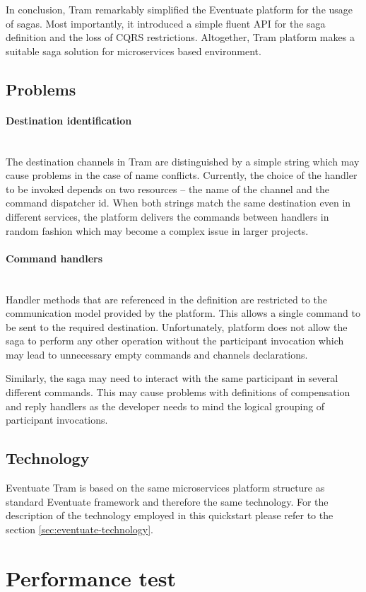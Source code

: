 \documentclass[oneside,
  digital, %
  table,   %
  nolof,     %
  nolot,     %
]{fithesis3}
\newcommand{\newlinepar}[1]{\paragraph{#1}\needspace{4\baselineskip}\mbox{}\\}
\begin{document}
In conclusion, Tram remarkably simplified the Eventuate platform for the usage of sagas. Most importantly, it introduced a simple fluent API for the saga definition and the loss of CQRS restrictions. Altogether, Tram platform makes a suitable saga solution for microservices based environment.

\subsection{Problems}

\newlinepar{Destination identification}

The destination channels in Tram are distinguished by a simple string which may cause problems in the case of name conflicts. Currently, the choice of the handler to be invoked depends on two resources -- the name of the channel and the command dispatcher id. When both strings match the same destination even in different services, the platform delivers the commands between handlers in random fashion which may become a complex issue in larger projects.

\newlinepar{Command handlers}

Handler methods that are referenced in the definition are restricted to the communication model provided by the platform. This allows a single command to be sent to the required destination. Unfortunately, platform does not allow the saga to perform any other operation without the participant invocation which may lead to unnecessary empty commands and channels declarations. 

Similarly, the saga may need to interact with the same participant in several different commands. This may cause problems with definitions of compensation and reply handlers as the developer needs to mind the logical grouping of participant invocations.

\subsection{Technology}

Eventuate Tram is based on the same microservices platform structure as standard Eventuate framework and therefore the same technology. For the description of the technology employed in this quickstart please refer to the section \ref{sec:eventuate-technology}.

\section{Performance test}
\end{document}
